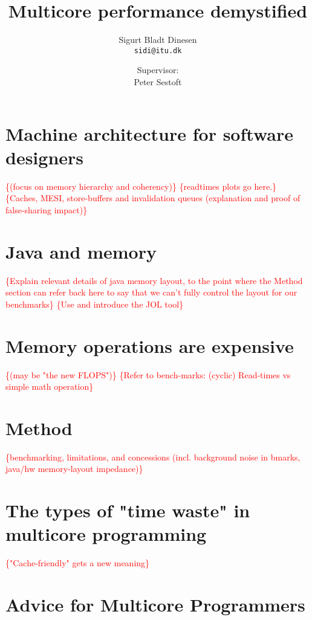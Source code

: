 \documentclass[a4paper, titlepage]{article}
\renewcommand{\%}{\scalebox{.9}{\oldpct}}
\newcommand\mynote[1]{\textcolor{red}{\{#1\}}}
\begin{document}
\title{Multicore performance demystified}
\author{
	Sigurt Bladt Dinesen
	\\\texttt{sidi@itu.dk}
	\and
	Supervisor:
	\\Peter Sestoft
}

\maketitle
\tableofcontents
\clearpage



\section{Machine architecture for software designers }
\mynote{(focus on memory hierarchy and coherency)}
\mynote{readtimes plots go here.}
\mynote{Caches, MESI, store-buffers and invalidation queues (explanation and proof of false-sharing impact)}

\section{Java and memory}
\mynote{Explain relevant details of java memory layout, to the point where the
Method section can refer back here to say that we can't fully control the layout
for our benchmarks}
\mynote{Use and introduce the JOL tool}

\section{Memory operations are expensive}
\mynote{(may be "the new FLOPS")}
\mynote{Refer to bench-marks: (cyclic) Read-times vs simple math operation}

\section{Method}
\mynote{benchmarking, limitations, and concessions (incl. background
noise in bmarks, java/hw memory-layout impedance)}

\section{The types of "time waste" in multicore programming}
\mynote{"Cache-friendly" gets a new meaning}



\section{Advice for Multicore Programmers}

\clearpage
\nocite{*}


\end{document}
